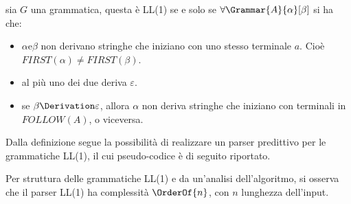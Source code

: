 \documentclass{subfiles}
\begin{document}
\begin{Definition*}
    sia \(G\) una grammatica, questa è LL(1) se e solo se \(\forall \Grammar{A}{\alpha}[\beta]\) si ha che:
    \begin{itemize}
        \item \(\alpha \text{e} \beta\) non derivano stringhe che iniziano con uno stesso terminale \(a\).
              Cioè \(FIRST(\alpha) \neq FIRST(\beta)\).
        \item al più uno dei due deriva \(\varepsilon\).
        \item se \(\beta \Derivation \varepsilon\), allora \(\alpha\) non deriva stringhe che iniziano con terminali in \(FOLLOW(A)\), o viceversa.
    \end{itemize}
\end{Definition*}

Dalla definizione segue la possibilità di realizzare un parser predittivo per le grammatiche LL(1), il cui pseudo-codice è di seguito riportato.


\noindent Per struttura delle grammatiche LL(1) e da un'analisi dell'algoritmo, si osserva che il parser LL(1) ha complessità \(\OrderOf{n}\),
con \(n\) lunghezza dell'input.
\end{document}
